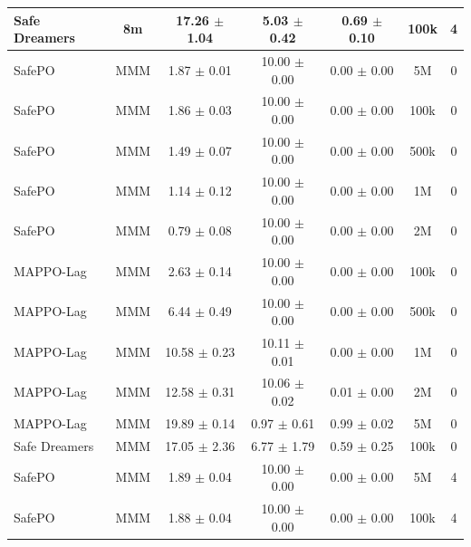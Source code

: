 \documentclass{article}
\begin{document}
\begin{longtable}{lcccccc}
Safe Dreamers & 8m & 17.26 $\pm$ 1.04 & 5.03 $\pm$ 0.42 & 0.69 $\pm$ 0.10 & 100k & 4 \\
\midrule
SafePO & MMM & \textcolor{green!60!black}{1.87 $\pm$ 0.01} & \textcolor{green!60!black}{1\textcolor{green!60!black}{0.00 $\pm$ 0.00}} & 0.00 $\pm$ 0.00 & 5M & 0 \\
SafePO & MMM & \textcolor{green!60!black}{1.86 $\pm$ 0.03} & \textcolor{green!60!black}{1\textcolor{green!60!black}{0.00 $\pm$ 0.00}} & 0.00 $\pm$ 0.00 & 100k & 0 \\
SafePO & MMM & \textcolor{green!60!black}{1.49 $\pm$ 0.07} & \textcolor{green!60!black}{1\textcolor{green!60!black}{0.00 $\pm$ 0.00}} & 0.00 $\pm$ 0.00 & 500k & 0 \\
SafePO & MMM & \textcolor{green!60!black}{1.14 $\pm$ 0.12} & \textcolor{green!60!black}{1\textcolor{green!60!black}{0.00 $\pm$ 0.00}} & 0.00 $\pm$ 0.00 & 1M & 0 \\
SafePO & MMM & \textcolor{green!60!black}{0.79 $\pm$ 0.08} & \textcolor{green!60!black}{1\textcolor{green!60!black}{0.00 $\pm$ 0.00}} & 0.00 $\pm$ 0.00 & 2M & 0 \\
MAPPO-Lag & MMM & \textcolor{green!60!black}{2.63 $\pm$ 0.14} & \textcolor{green!60!black}{1\textcolor{green!60!black}{0.00 $\pm$ 0.00}} & 0.00 $\pm$ 0.00 & 100k & 0 \\
MAPPO-Lag & MMM & \textcolor{green!60!black}{6.44 $\pm$ 0.49} & \textcolor{green!60!black}{1\textcolor{green!60!black}{0.00 $\pm$ 0.00}} & 0.00 $\pm$ 0.00 & 500k & 0 \\
MAPPO-Lag & MMM & \textcolor{green!60!black}{10.58 $\pm$ 0.23} & \textcolor{green!60!black}{10.11 $\pm$ 0.01} & \textcolor{green!60!black}{0.00 $\pm$ 0.00} & 1M & 0 \\
MAPPO-Lag & MMM & \textcolor{green!60!black}{12.58 $\pm$ 0.31} & \textcolor{green!60!black}{10.06 $\pm$ 0.02} & \textcolor{green!60!black}{0.01 $\pm$ 0.00} & 2M & 0 \\
MAPPO-Lag & MMM & \textcolor{red!70!black}{19.89 $\pm$ 0.14} & \textcolor{red!70!black}{0.97 $\pm$ 0.61} & \textcolor{red!70!black}{0.99 $\pm$ 0.02} & 5M & 0 \\
Safe Dreamers & MMM & 17.05 $\pm$ 2.36 & 6.77 $\pm$ 1.79 & 0.59 $\pm$ 0.25 & 100k & 0 \\
\midrule
SafePO & MMM & \textcolor{green!60!black}{1.89 $\pm$ 0.04} & \textcolor{green!60!black}{1\textcolor{green!60!black}{0.00 $\pm$ 0.00}} & 0.00 $\pm$ 0.00 & 5M & 4 \\
SafePO & MMM & \textcolor{green!60!black}{1.88 $\pm$ 0.04} & \textcolor{green!60!black}{1\textcolor{green!60!black}{0.00 $\pm$ 0.00}} & 0.00 $\pm$ 0.00 & 100k & 4 \\

\end{longtable}
\end{document}
